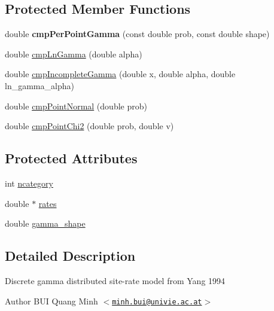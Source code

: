 \subsection*{Protected Member Functions}
\begin{DoxyCompactItemize}
\item 
\hypertarget{classRateGamma_af08e1d7ff25ba462357db3f019617658}{
double {\bfseries cmpPerPointGamma} (const double prob, const double shape)}
\label{classRateGamma_af08e1d7ff25ba462357db3f019617658}

\item 
double \hyperlink{classRateGamma_a10e81681fe39582f6ed6c89b554fbeab}{cmpLnGamma} (double alpha)
\item 
double \hyperlink{classRateGamma_a30b08c43d6ca5266a801b825baa3ac1f}{cmpIncompleteGamma} (double x, double alpha, double ln\_\-gamma\_\-alpha)
\item 
double \hyperlink{classRateGamma_a65fda804b83f71c65b365c16a6e01e4b}{cmpPointNormal} (double prob)
\item 
double \hyperlink{classRateGamma_ac7740803fb3a31189a17d9173848774b}{cmpPointChi2} (double prob, double v)
\end{DoxyCompactItemize}
\subsection*{Protected Attributes}
\begin{DoxyCompactItemize}
\item 
int \hyperlink{classRateGamma_adeaf25f809c07e9fdf368bece8190900}{ncategory}
\item 
double $\ast$ \hyperlink{classRateGamma_a9f72703c81eb78da12198c44fcf7d68c}{rates}
\item 
double \hyperlink{classRateGamma_a88433a75c040757da67d9007c2ab9db4}{gamma\_\-shape}
\end{DoxyCompactItemize}


\subsection{Detailed Description}
Discrete gamma distributed site-\/rate model from Yang 1994

\begin{DoxyAuthor}{Author}
BUI Quang Minh $<$\href{mailto:minh.bui@univie.ac.at}{\tt minh.bui@univie.ac.at}$>$ 
\end{DoxyAuthor}


